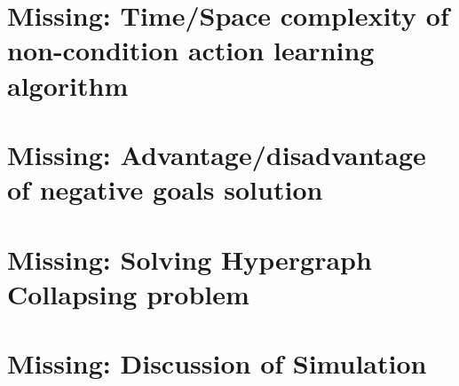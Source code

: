 \documentclass[Master.tex]{subfiles}
\begin{document}
\section{Missing: Time/Space complexity of non-condition action learning algorithm}

\section{Missing: Advantage/disadvantage of negative goals solution}

\section{Missing: Solving Hypergraph Collapsing problem}

\section{Missing: Discussion of Simulation}

%    
%
%    
%
%    
\end{document}

